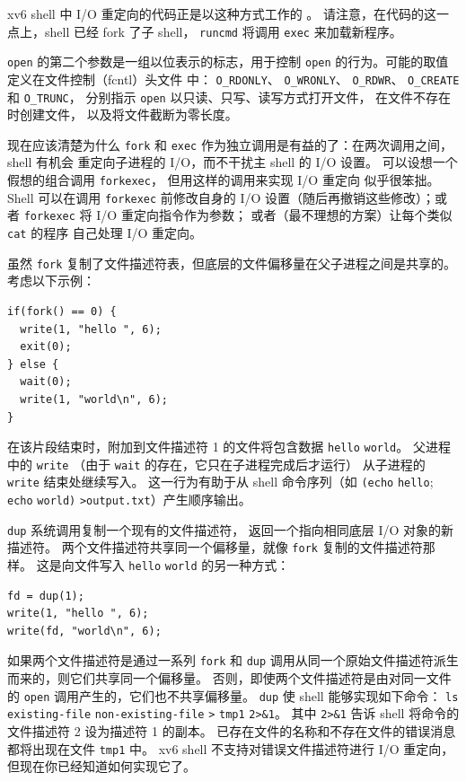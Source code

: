 xv6 shell 中 I/O 重定向的代码正是以这种方式工作的
。
请注意，在代码的这一点上，shell 已经 fork 了子 shell，
\lstinline{runcmd}
将调用
\lstinline{exec}
来加载新程序。

\lstinline{open} 的第二个参数是一组以位表示的标志，用于控制 \lstinline{open}
的行为。可能的取值定义在文件控制（fcntl）头文件
 中：
\lstinline{O_RDONLY}、
\lstinline{O_WRONLY}、
\lstinline{O_RDWR}、
\lstinline{O_CREATE} 和
\lstinline{O_TRUNC}，
分别指示 \lstinline{open} 以只读、只写、读写方式打开文件，
在文件不存在时创建文件，
以及将文件截断为零长度。

现在应该清楚为什么
\lstinline{fork}
和
\lstinline{exec}
作为独立调用是有益的了：在两次调用之间，shell 有机会
重定向子进程的 I/O，而不干扰主 shell 的 I/O 设置。
可以设想一个假想的组合调用
\lstinline{forkexec}，
但用这样的调用来实现 I/O 重定向
似乎很笨拙。
Shell 可以在调用 \lstinline{forkexec} 前修改自身的 I/O
设置（随后再撤销这些修改）；或者
\lstinline{forkexec} 将 I/O
重定向指令作为参数；
或者（最不理想的方案）让每个类似 \lstinline{cat} 的程序
自己处理 I/O 重定向。

虽然
\lstinline{fork}
复制了文件描述符表，但底层的文件偏移量在父子进程之间是共享的。
考虑以下示例：
\begin{lstlisting}[]
if(fork() == 0) {
  write(1, "hello ", 6);
  exit(0);
} else {
  wait(0);
  write(1, "world\n", 6);
}
\end{lstlisting}
在该片段结束时，附加到文件描述符 1
的文件将包含数据
\lstinline{hello}
\lstinline{world}。
父进程中的
\lstinline{write}
（由于
\lstinline{wait}
的存在，它只在子进程完成后才运行）
从子进程的
\lstinline{write}
结束处继续写入。
这一行为有助于从 shell 命令序列（如
\lstinline{(echo}
\lstinline{hello};
\lstinline{echo}
\lstinline{world)}
\lstinline{>output.txt}）产生顺序输出。

\lstinline{dup}
系统调用复制一个现有的文件描述符，
返回一个指向相同底层 I/O 对象的新描述符。
两个文件描述符共享同一个偏移量，就像
\lstinline{fork}
复制的文件描述符那样。
这是向文件写入
\lstinline{hello}
\lstinline{world}
的另一种方式：
\begin{lstlisting}[]
fd = dup(1);
write(1, "hello ", 6);
write(fd, "world\n", 6);
\end{lstlisting}

如果两个文件描述符是通过一系列
\lstinline{fork}
和
\lstinline{dup}
调用从同一个原始文件描述符派生而来的，则它们共享同一个偏移量。
否则，即使两个文件描述符是由对同一文件的
\lstinline{open}
调用产生的，它们也不共享偏移量。
\lstinline{dup}
使 shell 能够实现如下命令：
\lstinline{ls}
\lstinline{existing-file}
\lstinline{non-existing-file}
\lstinline{>}
\lstinline{tmp1}
\lstinline{2>&1}。
其中
\lstinline{2>&1}
告诉 shell 将命令的文件描述符 2 设为描述符 1 的副本。
已存在文件的名称和不存在文件的错误消息都将出现在文件
\lstinline{tmp1}
中。
xv6 shell 不支持对错误文件描述符进行 I/O 重定向，但现在你已经知道如何实现它了。

